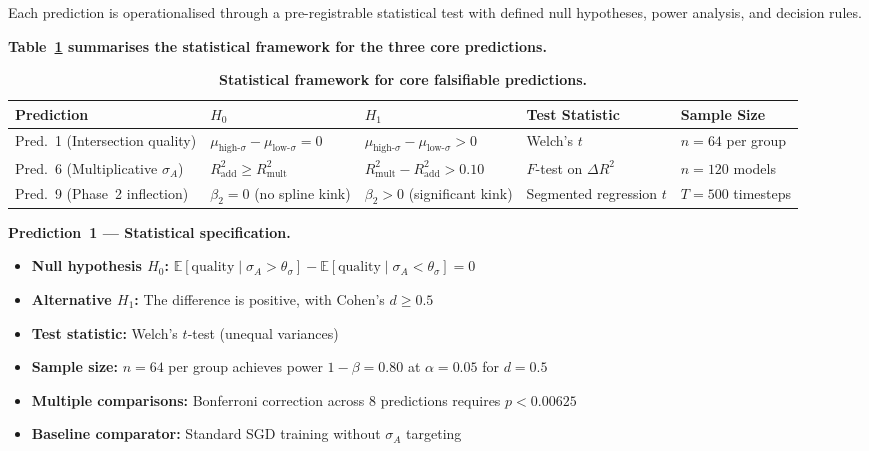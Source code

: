 Each prediction is operationalised through a pre-registrable statistical
test with defined null hypotheses, power analysis, and decision rules.

\textbf{Table~\ref{tab:predictions-framework} summarises the statistical
framework for the three core predictions.}

\begin{table}[htbp]
\centering
\caption{\textbf{Statistical framework for core falsifiable predictions.}}
\label{tab:predictions-framework}
\small
\begin{tabular}{@{}l p{2.2cm} p{2.2cm} p{2.5cm} p{2.0cm}@{}}
\toprule
\textbf{Prediction} & \textbf{$H_0$} & \textbf{$H_1$} & \textbf{Test Statistic} & \textbf{Sample Size} \\
\midrule
Pred.~1 (Intersection quality) & $\mu_{\text{high-}\sigma} - \mu_{\text{low-}\sigma} = 0$ & $\mu_{\text{high-}\sigma} - \mu_{\text{low-}\sigma} > 0$ & Welch's $t$ & $n = 64$ per group \\
Pred.~6 (Multiplicative $\sigma_A$) & $R^2_{\text{add}} \geq R^2_{\text{mult}}$ & $R^2_{\text{mult}} - R^2_{\text{add}} > 0.10$ & $F$-test on $\Delta R^2$ & $n = 120$ models \\
Pred.~9 (Phase~2 inflection) & $\beta_2 = 0$ (no spline kink) & $\beta_2 > 0$ (significant kink) & Segmented regression $t$ & $T = 500$ timesteps \\
\bottomrule
\end{tabular}
\end{table}

\textbf{Prediction~1 --- Statistical specification.}
\begin{itemize}[nosep]
\item \textbf{Null hypothesis $H_0$:} $\mathbb{E}[\text{quality} \mid \sigma_A > \theta_\sigma] - \mathbb{E}[\text{quality} \mid \sigma_A < \theta_\sigma] = 0$
\item \textbf{Alternative $H_1$:} The difference is positive, with Cohen's $d \geq 0.5$
\item \textbf{Test statistic:} Welch's $t$-test (unequal variances)
\item \textbf{Sample size:} $n = 64$ per group achieves power $1 - \beta = 0.80$ at $\alpha = 0.05$ for $d = 0.5$
\item \textbf{Multiple comparisons:} Bonferroni correction across 8 predictions requires $p < 0.00625$
\item \textbf{Baseline comparator:} Standard SGD training without $\sigma_A$ targeting
\end{itemize}

